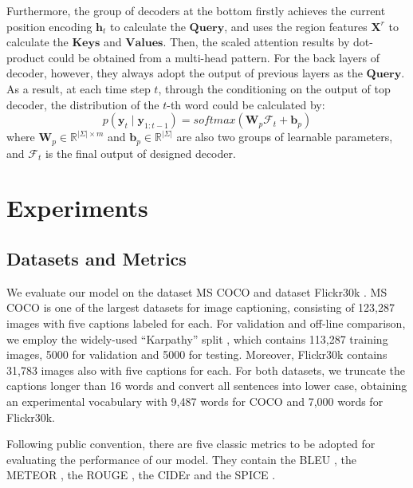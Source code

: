 \documentclass[review]{elsarticle}
\begin{document}
Furthermore, the group of decoders at the bottom firstly achieves the current position encoding \(\bm{h}_t\) to calculate the \(\bm{Query}\), and uses the region features \(\bm{X}^r\) to calculate the \(\bm{Keys}\) and \(\bm{Values}\). Then, the scaled attention results by dot-product could be obtained from a multi-head pattern. For the back layers of decoder, however, they always adopt the output of previous layers as the \(\bm{Query}\). As a result, at each time step \(t\), through the conditioning on the output of top decoder, the distribution of the $t$-th word could be calculated by:
\begin{equation}
  p(\bm{y}_t \mid \bm{y}_{1:t-1}) = {softmax} (\bm{W}_p \bm{\mathcal{F}}_{t}^{} + \bm{b}_p)
\end{equation}
where \(\bm{W}_p \in \mathbb{R}^{|\Sigma| \times m}\) and \(\bm{b}_p \in \mathbb{R}^{|\Sigma|}\) are also two groups of learnable parameters, and \(\bm{\mathcal{F}}_{t}^{} \) is the final output of designed decoder.

\section{Experiments}
\subsection{Datasets and Metrics}
We evaluate our model on the dataset MS COCO \cite{lin2014microsoft} and dataset Flickr30k \cite{young2014image}. MS COCO is one of the largest datasets for image captioning, consisting of 123,287 images with five captions labeled for each. For validation and off-line comparison, we employ the widely-used ``Karpathy'' split \cite{karpathy2015deep},  which contains 113,287 training images, 5000 for validation and 5000 for testing. Moreover, Flickr30k contains 31,783 images also with five captions for each. For both datasets, we truncate the captions longer than 16 words and convert all sentences into lower case, obtaining an experimental vocabulary with 9,487 words for COCO and 7,000 words for Flickr30k.

Following public convention, there are five classic metrics to be adopted for evaluating the performance of our model. They contain the BLEU \cite{papineni2002bleu}, the METEOR \cite{banerjee2005meteor}, the ROUGE \cite{lin-2004-rouge}, the CIDEr \cite{vedantam2015cider} and the SPICE \cite{spice2016}.
\end{document}
